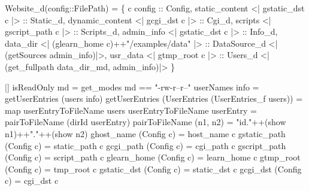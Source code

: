 \begin{code}
  Website_d(config::FilePath)  =  \{
  c                config               :: Config,           
  static_content   <| gstatic_dst c  |> :: Static_d,         
  dynamic_content  <| gcgi_dst c     |> :: Cgi_d,            
  scripts          <| gscript_path c |> :: Scripts_d,        
  admin_info       <| gstatic_dst c  |> :: Info_d,           
  data_dir         <| (glearn_home c)++"/examples/data" |>
                  :: DataSource_d <|(getSources admin_info)|>, 
  usr_data         <| gtmp_root c |>    :: Users_d  <|(get_fullpath data_dir_md, admin_info)|>   
 \}
 
|]
\mbox{}
isReadOnly md = get_modes md == "-rw-r--r--"
\mbox{}
userNames info = getUserEntries (users info)
getUserEntries (UserEntries (UserEntries_f users)) = map userEntryToFileName users
userEntryToFileName userEntry = pairToFileName (dirId userEntry)
pairToFileName (n1, n2) = "id."++(show n1)++"."++(show n2)
\mbox{}
ghost_name   (Config c) = host_name c
gstatic_path (Config c) = static_path c
gcgi_path    (Config c) = cgi_path c
gscript_path (Config c) = script_path c
glearn_home  (Config c) = learn_home c
gtmp_root    (Config c) = tmp_root c
gstatic_dst  (Config c) = static_dst c
gcgi_dst     (Config c) = cgi_dst c


\end{code}